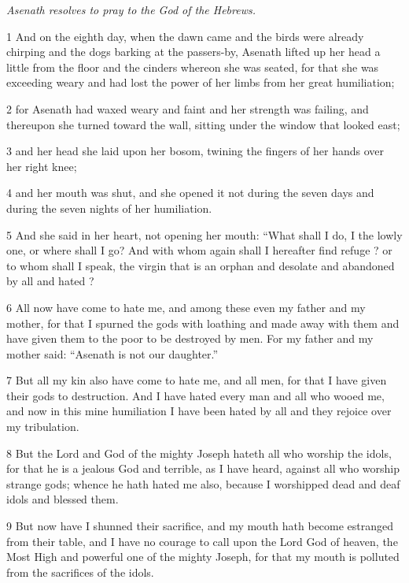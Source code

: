 \par \textit{Asenath resolves to pray to the God of the Hebrews.}

\par 1 And on the eighth day, when the dawn came and the birds were already chirping and the dogs barking at the passers-by, Asenath lifted up her head a little from the floor and the cinders whereon she was seated, for that she was exceeding weary and had lost the power of her limbs from her great humiliation; 

\par 2 for Asenath had waxed weary and faint and her strength was failing, and thereupon she turned toward the wall, sitting under the window that looked east; 

\par 3 and her head she laid upon her bosom, twining the fingers of her hands over her right knee; 

\par 4 and her mouth was shut, and she opened it not during the seven days and during the seven nights of her humiliation. 

\par 5 And she said in her heart, not opening her mouth: “What shall I do, I the lowly one, or where shall I go? And with whom again shall I hereafter find refuge ? or to whom shall I speak, the virgin that is an orphan and desolate and abandoned by all and hated ? 

\par 6 All now have come to hate me, and among these even my father and my mother, for that I spurned the gods with loathing and made away with them and have given them to the poor to be destroyed by men. For my father and my mother said: “Asenath is not our daughter.” 

\par 7 But all my kin also have come to hate me, and all men, for that I have given their gods to destruction. And I have hated every man and all who wooed me, and now in this mine humiliation I have been hated by all and they rejoice over my tribulation. 

\par 8 But the Lord and God of the mighty Joseph hateth all who worship the idols, for that he is a jealous God and terrible, as I have heard, against all who worship strange gods; whence he hath hated me also, because I worshipped dead and deaf idols and blessed them. 

\par 9 But now have I shunned their sacrifice, and my mouth hath become estranged from their table, and I have no courage to call upon the Lord God of heaven, the Most High and powerful one of the mighty Joseph, for that my mouth is polluted from the sacrifices of the idols. 

